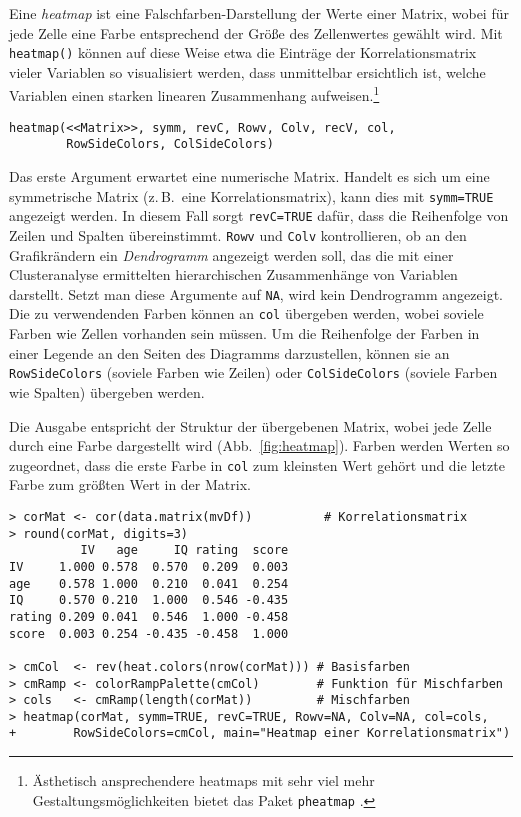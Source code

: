 Eine \emph{heatmap} ist eine Falschfarben-Darstellung der Werte einer Matrix, wobei für jede Zelle eine Farbe entsprechend der Größe des Zellenwertes gewählt wird. Mit \lstinline!heatmap()! können auf diese Weise etwa die Einträge der Korrelationsmatrix vieler Variablen so visualisiert werden, dass unmittelbar ersichtlich ist, welche Variablen einen starken linearen Zusammenhang aufweisen.\footnote{Ästhetisch ansprechendere heatmaps mit sehr viel mehr Gestaltungsmöglichkeiten bietet das Paket  \lstinline!pheatmap! \cite{Kolde2015}.}
\begin{lstlisting}
heatmap(<<Matrix>>, symm, revC, Rowv, Colv, recV, col,
        RowSideColors, ColSideColors)
\end{lstlisting}

Das erste Argument erwartet eine numerische Matrix. Handelt es sich um eine symmetrische Matrix (z.\,B.\ eine Korrelationsmatrix), kann dies mit \lstinline!symm=TRUE! angezeigt werden. In diesem Fall sorgt \lstinline!revC=TRUE! dafür, dass die Reihenfolge von Zeilen und Spalten übereinstimmt. \lstinline!Rowv! und \lstinline!Colv! kontrollieren, ob an den Grafikrändern ein \emph{Dendrogramm} angezeigt werden soll, das die mit einer Clusteranalyse ermittelten hierarchischen Zusammenhänge von Variablen darstellt. Setzt man diese Argumente auf \lstinline!NA!, wird kein Dendrogramm angezeigt. Die zu verwendenden Farben können an \lstinline!col! übergeben werden, wobei soviele Farben wie Zellen vorhanden sein müssen. Um die Reihenfolge der Farben in einer Legende an den Seiten des Diagramms darzustellen, können sie an \lstinline!RowSideColors! (soviele Farben wie Zeilen) oder \lstinline!ColSideColors! (soviele Farben wie Spalten) übergeben werden.

Die Ausgabe entspricht der Struktur der übergebenen Matrix, wobei jede Zelle durch eine Farbe dargestellt wird (Abb.\ \ref{fig:heatmap}). Farben werden Werten so zugeordnet, dass die erste Farbe in \lstinline!col! zum kleinsten Wert gehört und die letzte Farbe zum größten Wert in der Matrix.
\begin{lstlisting}
> corMat <- cor(data.matrix(mvDf))          # Korrelationsmatrix
> round(corMat, digits=3)
          IV   age     IQ rating  score
IV     1.000 0.578  0.570  0.209  0.003
age    0.578 1.000  0.210  0.041  0.254
IQ     0.570 0.210  1.000  0.546 -0.435
rating 0.209 0.041  0.546  1.000 -0.458
score  0.003 0.254 -0.435 -0.458  1.000

> cmCol  <- rev(heat.colors(nrow(corMat))) # Basisfarben
> cmRamp <- colorRampPalette(cmCol)        # Funktion für Mischfarben
> cols   <- cmRamp(length(corMat))         # Mischfarben
> heatmap(corMat, symm=TRUE, revC=TRUE, Rowv=NA, Colv=NA, col=cols,
+        RowSideColors=cmCol, main="Heatmap einer Korrelationsmatrix")
\end{lstlisting}

